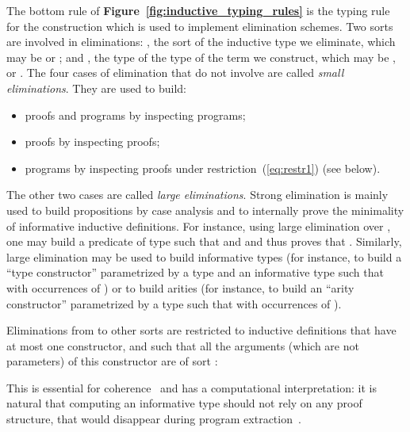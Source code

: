 \documentclass[a4paper,USenglish]{lipics}
\begin{document}
The bottom rule of \textsf{\textbf{\small Figure~\ref{fig:inductive_typing_rules}}} is the typing
rule for the  construction which is used to implement elimination
schemes. Two sorts are involved in eliminations: , the sort of the
inductive type we eliminate, which may be  or ; and ,
the type of the type of the term we construct, which may be ,  or
. The four cases of elimination that do not involve 
are called \emph{small eliminations}.
They are used to build:
\begin{itemize}
\item proofs and programs by inspecting programs;
\item proofs by inspecting proofs;
\item programs by inspecting proofs under restriction~(\ref{eq:restr1})
  (see below).
\end{itemize}
The other two cases are called \emph{large eliminations}. Strong elimination is
mainly used to build propositions by case analysis and to internally
prove the minimality of informative
inductive definitions. For instance, using large elimination over , one may build a
predicate  of type  such that  and
 and thus proves that . Similarly,
large elimination may be used to build informative types (for instance, to
build a ``type constructor''  parametrized by a type
 and an informative type  such that
 with  occurrences of )
or to build arities (for instance, to build an ``arity constructor''
 parametrized by a type  such that
 with  occurrences of ).

Eliminations from  to other sorts are restricted to inductive
definitions that have at most one constructor, and such that all the
arguments (which are not parameters) of this constructor are of
sort :

This is essential for coherence~\cite{DBLP:conf/lics/Coquand86}
and has a computational interpretation: it is natural that computing an
informative type should not rely on any proof structure, that would
disappear during program
extraction~\cite{DBLP:conf/types/Letouzey02,letouzey04}.
\end{document}

